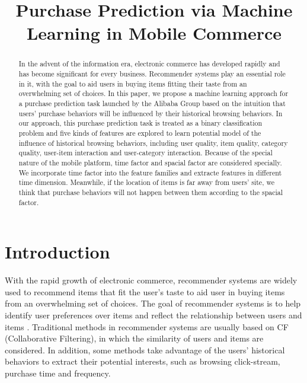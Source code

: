\documentclass{llncs}
\begin{document}
%
\title{Purchase Prediction via Machine Learning in Mobile Commerce}
%
\maketitle
%
\begin{abstract}
In the advent of the information era, electronic commerce has
developed rapidly and has become significant for every business.
Recommender systems play an essential role in it,
with the goal to aid users in buying items
fitting their taste from an overwhelming set of choices.
In this paper, we propose a machine learning approach
for a purchase prediction task launched by the Alibaba Group
based on the intuition that users' purchase behaviors
will be influenced by their historical browsing behaviors.
In our approach, this purchase prediction task is treated as
a binary classification problem
and five kinds of features are explored to learn potential model
of the influence of historical browsing behaviors,
including user quality, item quality, category quality,
user-item interaction and user-category interaction.
Because of the special nature of the mobile platform,
time factor and spacial factor are considered specially.
We incorporate time factor into the feature families
and extracte features in different time dimension.
Meanwhile, if the location of items is far away from users' site,
we think that purchase behaviors will not happen between them
according to the spacial factor.
\end{abstract}
%
\section{Introduction}
With the rapid growth of electronic commerce,
recommender systems are widely used to recommend items that fit the user's taste
to aid user in buying items from an overwhelming set of choices.
The goal of recommender systems is to help identify user preferences over items and
reflect the relationship between users and items \cite{L2012Recommender}.
Traditional methods in recommender systems are usually based on
CF (Collaborative Filtering),
in which the similarity of users and items are considered.
In addition, some methods take advantage of the users' historical behaviors
to extract their potential interests,
such as browsing click-stream, purchase time and frequency.
\end{document}
